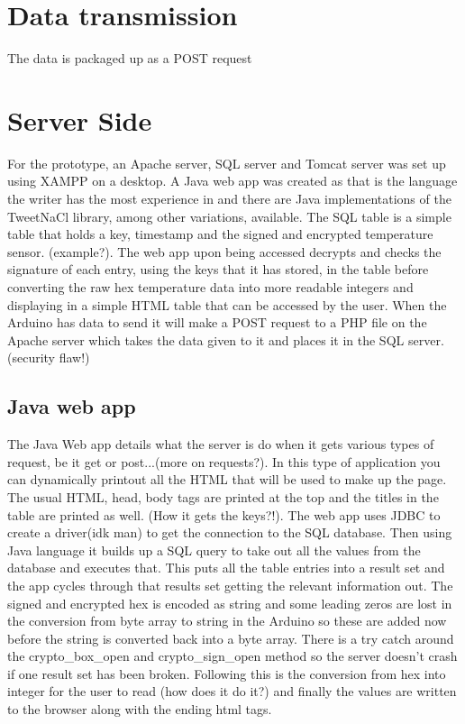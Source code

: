 \section{Data transmission}
The data is packaged up as a POST request
 
\section{Server Side}

For the prototype, an Apache server, SQL server and Tomcat server was set up using XAMPP on a desktop. A Java web app was created as that is the language the writer has the most experience in and there are Java implementations of the TweetNaCl library, among other variations, available. The SQL table is a simple table that holds a key, timestamp and the signed and encrypted temperature sensor. (example?). The web app upon being accessed decrypts and checks the signature of each entry, using the keys that it has stored, in the table before converting the raw hex temperature data into more readable integers and displaying in a simple HTML table that can be accessed by the user. When the Arduino has data to send it will make a POST request to a PHP file on the Apache server which takes the data given to it and places it in the SQL server. (security flaw!)

\subsection{Java web app}

The Java Web app details what the server is do when it gets various types of request, be it get or post...(more on requests?). In this type of application you can dynamically printout all the HTML that will be used to make up the page. The usual  HTML, head, body tags are printed at the top and the titles in the table are printed as well. (How it gets the keys?!). The web app uses JDBC to create a driver(idk man) to get the connection to the SQL database. Then using Java language it builds up a SQL query to take out all the values from the database and executes that. This puts all the table entries into a result set and the app cycles through that results set getting the relevant information out. The signed and encrypted hex is encoded as string and some leading zeros are lost in the conversion from byte array to string in the Arduino so these are added now before the string is converted back into a byte array. There is a try catch around the crypto\_box\_open and crypto\_sign\_open method so the server doesn't crash if one result set has been broken. Following this is the conversion from hex into integer for the user to read (how does it do it?) and finally the values are written to the browser along with the ending html tags.

